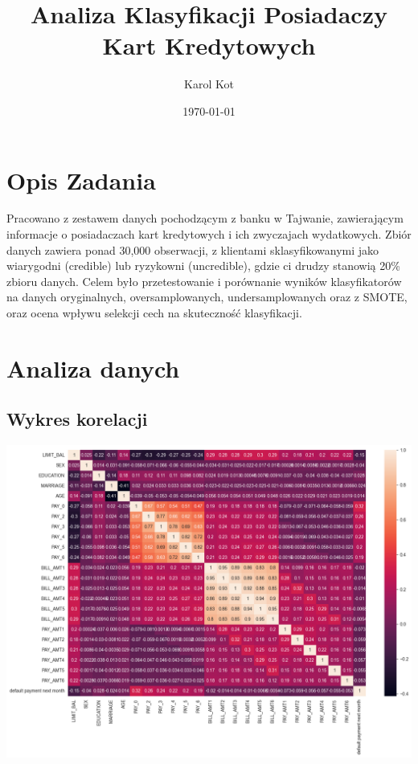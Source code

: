 \documentclass{article}
\begin{document}
\title{Analiza Klasyfikacji Posiadaczy Kart Kredytowych}
\author{Karol Kot}
\date{\today}
\maketitle

\section{Opis Zadania}
Pracowano z zestawem danych pochodzącym z banku w Tajwanie, zawierającym informacje o posiadaczach kart kredytowych i ich zwyczajach wydatkowych.
Zbiór danych zawiera ponad 30,000 obserwacji, z klientami sklasyfikowanymi jako wiarygodni (credible) lub ryzykowni (uncredible), gdzie ci drudzy stanowią 20\% zbioru danych.
Celem było przetestowanie i porównanie wyników klasyfikatorów na danych oryginalnych, oversamplowanych, undersamplowanych oraz z SMOTE,
oraz ocena wpływu selekcji cech na skuteczność klasyfikacji.

\section{Analiza danych}
\subsection{Wykres korelacji}
\includegraphics[width=1\textwidth]{./corelation.png}
\end{document}
